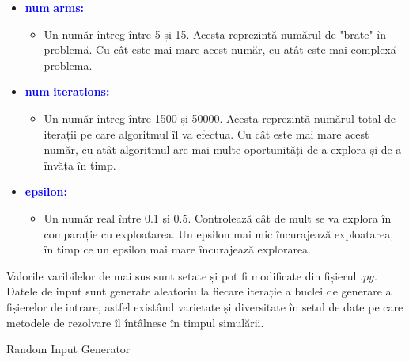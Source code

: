 \documentclass{article}
\begin{document}
\begin{itemize}
\item\textbf{\textcolor{blue}{ num$\_$arms:}} 
\begin{itemize}
      \item Un număr întreg între 5 și 15. Acesta reprezintă numărul de "brațe"  în problemă. Cu cât este mai mare acest număr, cu atât este mai complexă problema.
\end{itemize}
\item\textbf{\textcolor{blue}{ num$\_$iterations:}} 
\begin{itemize}
      \item Un număr întreg între 1500 și 50000. Acesta reprezintă numărul total de iterații pe care algoritmul îl va efectua. Cu cât este mai mare acest număr, cu atât algoritmul are mai multe oportunități de a explora și de a învăța în timp. 
\end{itemize}
\item\textbf{\textcolor{blue}{ epsilon:}} 
\begin{itemize}
      \item Un număr real între 0.1 și 0.5. Controlează cât de mult se va explora în comparație cu exploatarea. Un epsilon mai mic încurajează exploatarea, în timp ce un epsilon mai mare încurajează explorarea.
\end{itemize}
\end{itemize}
Valorile varibilelor de mai sus sunt setate și pot fi modificate din fișierul $.py$. Datele de input sunt generate aleatoriu la fiecare iterație a buclei de generare a fișierelor de intrare, astfel existând varietate și diversitate în setul de date pe care metodele de rezolvare îl întâlnesc în timpul simulării. 
\begin{algorithm}
\caption{Random Input Generator}
\end{algorithm}
\end{document}
